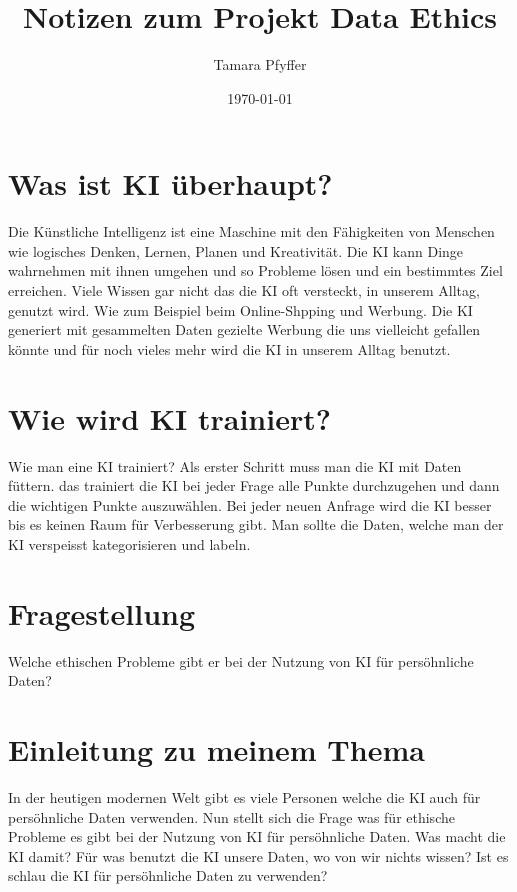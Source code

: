 \documentclass{article}
\title{Notizen zum Projekt Data Ethics}
\author{Tamara Pfyffer}
\date{\today}
\begin{document}
\maketitle


\tableofcontents

\section{Was ist KI überhaupt?}
Die Künstliche Intelligenz ist eine Maschine mit den Fähigkeiten von Menschen wie logisches Denken, Lernen, Planen und Kreativität. Die KI kann Dinge wahrnehmen mit ihnen umgehen und so Probleme lösen und ein bestimmtes Ziel erreichen. Viele Wissen gar nicht das die KI oft versteckt, in unserem Alltag, genutzt wird. Wie zum Beispiel beim Online-Shpping und Werbung. Die KI generiert mit gesammelten Daten gezielte Werbung die uns vielleicht gefallen könnte und für noch vieles mehr wird die KI in unserem Alltag benutzt.

\section{Wie wird KI trainiert?}
Wie man eine KI trainiert? Als erster Schritt muss man die KI mit Daten füttern. das trainiert die KI bei jeder Frage alle Punkte durchzugehen und dann die wichtigen Punkte auszuwählen. Bei jeder neuen Anfrage wird die KI besser bis es keinen Raum für Verbesserung gibt. Man sollte die Daten, welche man der KI verspeisst kategorisieren und labeln.

\section{Fragestellung}
Welche ethischen Probleme gibt er bei der Nutzung von KI für persöhnliche Daten? 

\section{Einleitung zu meinem Thema}
In der heutigen modernen Welt gibt es viele Personen welche die KI auch für persöhnliche Daten verwenden. Nun stellt sich die Frage was für ethische Probleme es gibt bei der Nutzung von KI für persöhnliche Daten. Was macht die KI damit? Für was benutzt die KI unsere Daten, wo von wir nichts wissen? Ist es schlau die KI für persöhnliche Daten zu verwenden? 
\end{document}
